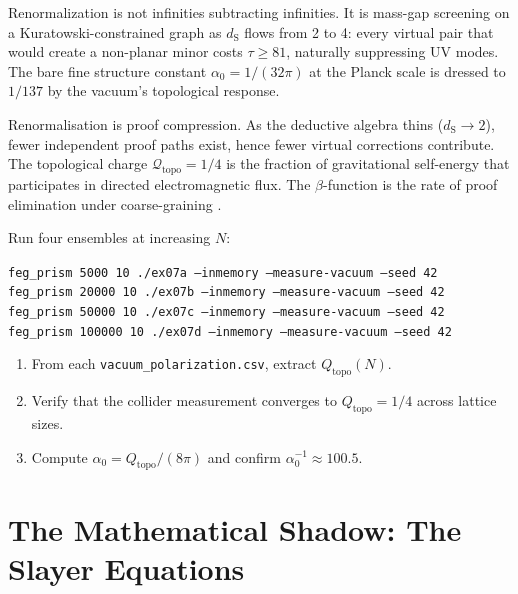 \documentclass[11pt, a4paper, openany]{book}
\newcommand{\dS}{d_{\mathrm{S}}}
\begin{document}
\begin{result}
Renormalization is not infinities subtracting infinities. It is
mass-gap screening on a Kuratowski-constrained graph as $\dS$ flows
from 2 to 4: every virtual pair that would create a non-planar minor
costs $\tau \geq 81$, naturally suppressing UV modes. The bare fine structure constant
$\alpha_0 = 1/(32\pi)$ at the Planck scale is dressed to
$1/137$ by the vacuum's topological response.
\end{result}

\begin{logicalreading}
Renormalisation is proof compression. As the deductive algebra thins
($\dS \to 2$), fewer independent proof paths exist, hence fewer virtual
corrections contribute. The topological charge
$\mathcal{Q}_{\mathrm{topo}} = 1/4$ is the fraction of gravitational
self-energy that participates in directed electromagnetic flux.
The $\beta$-function is the rate of proof
elimination under coarse-graining \cite{stone1936}.
\end{logicalreading}


\begin{simulation}
Run four ensembles at increasing $N$:

\smallskip
\noindent
\texttt{feg\_prism \phantom{0}5000 10 ./ex07a --inmemory --measure-vacuum --seed 42}\\
\texttt{feg\_prism 20000 10 ./ex07b --inmemory --measure-vacuum --seed 42}\\
\texttt{feg\_prism 50000 10 ./ex07c --inmemory --measure-vacuum --seed 42}\\
\texttt{feg\_prism 100000 10 ./ex07d --inmemory --measure-vacuum --seed 42}
\smallskip

\begin{enumerate}
\item From each \texttt{vacuum\_polarization.csv}, extract $Q_{\mathrm{topo}}(N)$.
\item Verify that the collider measurement converges to $Q_{\mathrm{topo}} = 1/4$ across lattice sizes.
\item Compute $\alpha_0 = Q_{\mathrm{topo}}/(8\pi)$ and confirm $\alpha_0^{-1} \approx 100.5$.
\end{enumerate}
\end{simulation}


\chapter{The Mathematical Shadow: The Slayer Equations}\label{ch:slayer}
\end{document}
